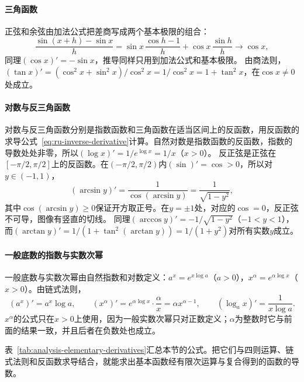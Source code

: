 \paragraph{三角函数}
正弦和余弦由加法公式把差商写成两个基本极限的组合：
\[
 \frac{\sin(x+h)-\sin x}h=\sin x\,\frac{\cos h-1}h+\cos x\,\frac{\sin h}h\to\cos x,
\]
同理$(\cos x)'=-\sin x$，推导同样只用到加法公式和基本极限。
由商法则，$(\tan x)'=(\cos^2x+\sin^2x)/\cos^2x=1/\cos^2x=1+\tan^2x$，在$\cos x\neq0$处成立。

\paragraph{对数与反三角函数}
对数与反三角函数分别是指数函数和三角函数在适当区间上的反函数，用反函数的求导公式~\eqref{eq:ru-inverse-derivative}计算。自然对数是指数函数的反函数，指数的导数处处非零，所以$(\log x)'=1/e^{\log x}=1/x$（$x>0$）。
反正弦是正弦在$[-\pi/2,\pi/2]$上的反函数。在$(-\pi/2,\pi/2)$内$(\sin)'=\cos>0$，所以对$y\in(-1,1)$，
\[
 (\arcsin y)'=\frac1{\cos(\arcsin y)}=\frac1{\sqrt{1-y^2}},
\]
其中$\cos(\arcsin y)\geq0$保证开方取正号。在$y=\pm1$处，对应的$\cos=0$，反正弦不可导，图像有竖直的切线。
同理$(\arccos y)'=-1/\sqrt{1-y^2}$（$-1<y<1$），而$(\arctan y)'=1/(1+\tan^2(\arctan y))=1/(1+y^2)$对所有实数$y$成立。

\paragraph{一般底数的指数与实数次幂}
一般底数与实数次幂由自然指数和对数定义：$a^x=e^{x\log a}$（$a>0$），$x^\alpha=e^{\alpha\log x}$（$x>0$）。由链式法则，
\[
 (a^x)'=a^x\log a,\qquad (x^\alpha)'=e^{\alpha\log x}\cdot\frac\alpha x=\alpha x^{\alpha-1},\qquad (\log_ax)'=\frac1{x\log a}.
\]
$x^\alpha$的公式只在$x>0$上使用，因为一般实数次幂只对正数定义；$\alpha$为整数时它与前面的结果一致，并且后者在负数处也成立。

表~\ref{tab:analysis-elementary-derivatives}汇总本节的公式。把它们与四则运算、链式法则和反函数求导结合，就能求出基本函数经有限次运算与复合得到的函数的导数。

